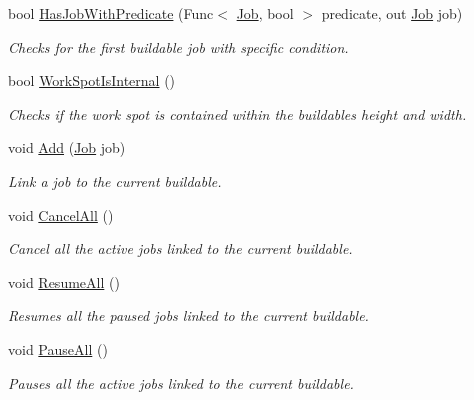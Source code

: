\begin{DoxyCompactItemize}
bool \hyperlink{class_buildable_jobs_af90f2c51bf74125bd84ee3320b54ffe2}{Has\+Job\+With\+Predicate} (Func$<$ \hyperlink{class_job}{Job}, bool $>$ predicate, out \hyperlink{class_job}{Job} job)
\begin{DoxyCompactList}\small\item\em Checks for the first buildable job with specific condition. \end{DoxyCompactList}\item 
bool \hyperlink{class_buildable_jobs_ae2c9644155b5d308a251231b6b07fdac}{Work\+Spot\+Is\+Internal} ()
\begin{DoxyCompactList}\small\item\em Checks if the work spot is contained within the buildable\textquotesingle{}s height and width. \end{DoxyCompactList}\item 
void \hyperlink{class_buildable_jobs_acd535917cc45b5f3a61ca86be97ac2a8}{Add} (\hyperlink{class_job}{Job} job)
\begin{DoxyCompactList}\small\item\em Link a job to the current buildable. \end{DoxyCompactList}\item 
void \hyperlink{class_buildable_jobs_aa314a2e1dfe5543a5ae6d467dd24d9f2}{Cancel\+All} ()
\begin{DoxyCompactList}\small\item\em Cancel all the active jobs linked to the current buildable. \end{DoxyCompactList}\item 
void \hyperlink{class_buildable_jobs_a79e890b27c8b98c6379026d1f4c039b8}{Resume\+All} ()
\begin{DoxyCompactList}\small\item\em Resumes all the paused jobs linked to the current buildable. \end{DoxyCompactList}\item 
void \hyperlink{class_buildable_jobs_a1c84d8b98fe126a82acfc8eba0bdc4b6}{Pause\+All} ()
\begin{DoxyCompactList}\small\item\em Pauses all the active jobs linked to the current buildable. \end{DoxyCompactList}\end{DoxyCompactItemize}
